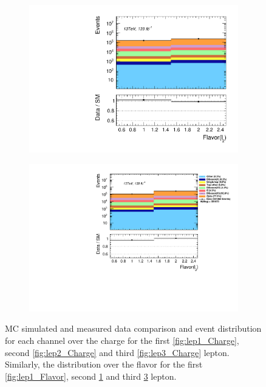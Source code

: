 \begin{figure}[H]
{\begin{subfigure}{.405\textwidth}
        \includegraphics[width=\textwidth]{Figures/FeaturesHistograms/lep2_Flavor.pdf}
        \caption{}
        \label{fig:lep2_Flavor}
    \end{subfigure}
    \hfill
    \begin{subfigure}{.525\textwidth}
        \includegraphics[width=\textwidth]{Figures/FeaturesHistograms/lep3_Flavor.pdf}
        \caption{}
        \label{fig:lep3_Flavor}
    \end{subfigure}
    }
    \caption[\acs{MC} simulated and measured data comparison and event distribution for each channel over the charge for the first,
    second and third lepton. Similarly, the distribution over the flavor for the first, second and third lepton]{\acs{MC} simulated and measured data 
    comparison and event distribution for each channel over the charge for the first \ref{fig:lep1_Charge},
    second \ref{fig:lep2_Charge} and third \ref{fig:lep3_Charge} lepton. Similarly, the distribution over the flavor
    for the first \ref{fig:lep1_Flavor}, second \ref{fig:lep2_Flavor} and third \ref{fig:lep3_Flavor} lepton.}
\end{figure}
